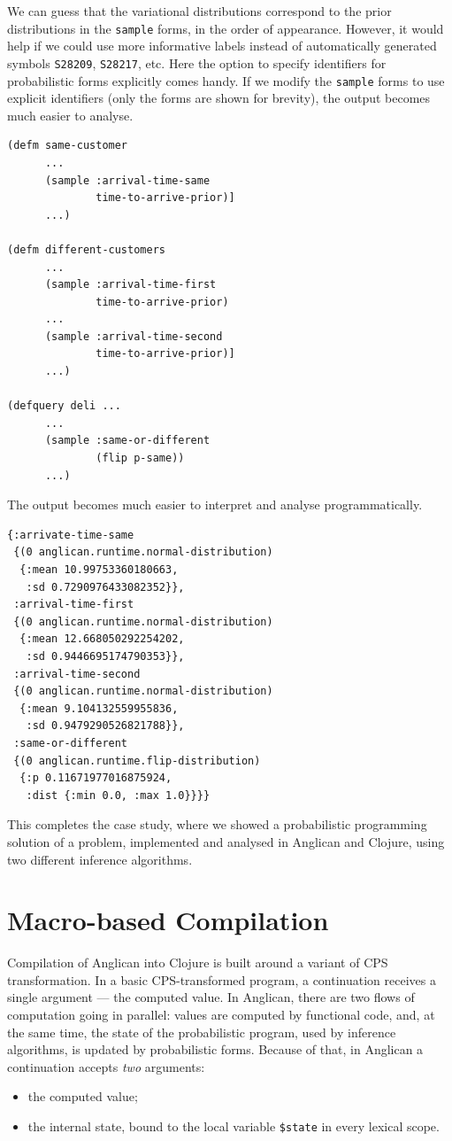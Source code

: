 \documentclass[preprint]{sigplanconf}
\begin{document}
We can guess that the variational distributions correspond to the
prior distributions in the \texttt{sample} forms, in the order
of appearance. However, it would help if we could use more
informative labels instead of automatically generated symbols
\texttt{S28209}, \texttt{S28217}, etc. Here the option to
specify identifiers for probabilistic forms explicitly comes
handy. If we modify the \texttt{sample} forms to use explicit identifiers
(only the forms are shown for brevity), the output becomes much
easier to analyse.

\begin{lstlisting}[style=default]
(defm same-customer 
      ...
      (sample :arrival-time-same
              time-to-arrive-prior)]
      ...)

(defm different-customers
      ... 
      (sample :arrival-time-first
              time-to-arrive-prior)
      ...
      (sample :arrival-time-second
              time-to-arrive-prior)]
      ...)

(defquery deli ...
      ...
      (sample :same-or-different
              (flip p-same))
      ...)
\end{lstlisting}

The output becomes much easier to interpret and analyse
programmatically.

\begin{lstlisting}[style=default]
{:arrivate-time-same
 {(0 anglican.runtime.normal-distribution)
  {:mean 10.99753360180663,
   :sd 0.7290976433082352}},
 :arrival-time-first
 {(0 anglican.runtime.normal-distribution)
  {:mean 12.668050292254202,
   :sd 0.9446695174790353}},
 :arrival-time-second
 {(0 anglican.runtime.normal-distribution)
  {:mean 9.104132559955836,
   :sd 0.9479290526821788}},
 :same-or-different
 {(0 anglican.runtime.flip-distribution)
  {:p 0.11671977016875924,
   :dist {:min 0.0, :max 1.0}}}}
\end{lstlisting}

This completes the case study, where we showed a probabilistic
programming solution of a problem, implemented and analysed in
Anglican and Clojure, using two different inference algorithms.

\section{Macro-based Compilation}
\label{sec:compilation}

Compilation of Anglican into Clojure is built around a variant of CPS
transformation. In a basic CPS-transformed program, a
continuation receives a single argument --- the computed value.
In Anglican, there are two flows of computation going in
parallel: values are computed by functional code, and,
at the same time, the state of the probabilistic program,
used by inference algorithms, is updated by
probabilistic forms. Because of that, in Anglican a continuation
accepts  \textit{two} arguments:
\begin{itemize}
    \item the computed value;
    \item the internal state, bound to the local variable
        \texttt{\$state} in every lexical scope.
\end{itemize}
\end{document}

